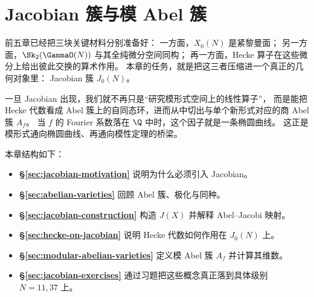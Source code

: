 \chapter{Jacobian 簇与模 Abel 簇}
\label{ch:jacobians}

前五章已经把三块关键材料分别准备好：
一方面，$X_0(N)$ 是紧黎曼面；
另一方面，$\Sk_2(\GammaO(N))$ 与其全纯微分空间同构；
再一方面，Hecke 算子在这些微分上给出彼此交换的算术作用。
本章的任务，就是把这三者压缩进一个真正的几何对象里：
Jacobian 簇 $J_0(N)$。

一旦 Jacobian 出现，我们就不再只是“研究模形式空间上的线性算子”，
而是能把 Hecke 代数看成 Abel 簇上的自同态环，进而从中切出与单个新形式对应的商 Abel 簇 $A_f$。
当 $f$ 的 Fourier 系数落在 $\Q$ 中时，这个因子就是一条椭圆曲线。
这正是模形式通向椭圆曲线、再通向模性定理的桥梁。

本章结构如下：
\begin{itemize}
  \item \textbf{§\ref{sec:jacobian-motivation}} 说明为什么必须引入 Jacobian。
  \item \textbf{§\ref{sec:abelian-varieties}} 回顾 Abel 簇、极化与同种。
  \item \textbf{§\ref{sec:jacobian-construction}} 构造 $J(X)$ 并解释 Abel--Jacobi 映射。
  \item \textbf{§\ref{sec:hecke-on-jacobian}} 说明 Hecke 代数如何作用在 $J_0(N)$ 上。
  \item \textbf{§\ref{sec:modular-abelian-varieties}} 定义模 Abel 簇 $A_f$ 并计算其维数。
  \item \textbf{§\ref{sec:jacobian-exercises}} 通过习题把这些概念真正落到具体级别 $N=11,37$ 上。
\end{itemize}







